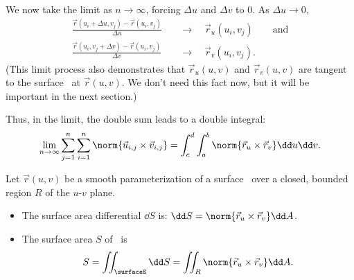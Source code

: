 We now take the limit as $n\to\infty$, forcing $\Delta u$ and $\Delta v$ to 0. As $\Delta u\to 0$,
\begin{align*}
\frac{\vec r(u_i+\Delta u,v_j) - \vec r(u_i,v_j)}{\Delta u}\quad
&\to\quad \vec r_u(u_i,v_j)\qquad \text{and}\\
\frac{\vec r(u_i,v_j+\Delta v)-\vec r(u_i,v_j)}{\Delta v}\quad
&\to\quad \vec r_v(u_i,v_j).
\end{align*}
(This limit process also demonstrates that $\vec r_u(u,v)$ and $\vec r_v(u,v)$ are tangent to the surface \surfaceS\ at $\vec r(u,v)$. We don't need this fact now, but it will be important in the next section.)

Thus, in the limit, the double sum leads to a double integral:
\[
\lim_{n\to\infty} \sum_{j=1}^n\sum_{i=1}^n \norm{\vec u_{i,j}\times \vec v_{i,j}}
= \int_c^d\int_a^b \norm{\vec r_u\times\vec r_v}\dd u\dd v.
\]

\begin{theorem}\label{thm:par_surface_area}%
Let $\vec r(u,v)$ be a smooth parameterization of a surface \surfaceS\ over a closed, bounded region $R$ of the $u$-$v$ plane. 
\begin{itemize}
\item	The surface area differential $\dd S$ is: $\dd S = \norm{\vec r_u\times \vec r_v}\dd A$.
\item The surface area $S$ of \surfaceS\ is
\[S = \iint_{\surfaceS}\dd S = \iint_R \norm{\vec r_u\times \vec r_v}\dd A.\]
\end{itemize}
\end{theorem}


